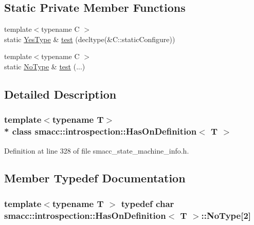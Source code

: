 \subsection*{Static Private Member Functions}
\begin{DoxyCompactItemize}
\item 
{\footnotesize template$<$typename C $>$ }\\static \hyperlink{classsmacc_1_1introspection_1_1HasOnDefinition_ad18cda8f47c5a0e9660b7c7ca54d98c7}{Yes\+Type} \& \hyperlink{classsmacc_1_1introspection_1_1HasOnDefinition_a9271922a017eed3dc8d9ef931239ca3d}{test} (decltype(\&C\+::static\+Configure))
\item 
{\footnotesize template$<$typename C $>$ }\\static \hyperlink{classsmacc_1_1introspection_1_1HasOnDefinition_ab6416d52a925d6a0ce9204897191692e}{No\+Type} \& \hyperlink{classsmacc_1_1introspection_1_1HasOnDefinition_a22cbbab4a5ce8f1b85cfd98a374f7f49}{test} (...)
\end{DoxyCompactItemize}


\subsection{Detailed Description}
\subsubsection*{template$<$typename T$>$\\*
class smacc\+::introspection\+::\+Has\+On\+Definition$<$ T $>$}



Definition at line 328 of file smacc\+\_\+state\+\_\+machine\+\_\+info.\+h.



\subsection{Member Typedef Documentation}
\subsubsection[{\texorpdfstring{No\+Type}{NoType}}]{\setlength{\rightskip}{0pt plus 5cm}template$<$typename T $>$ typedef char {\bf smacc\+::introspection\+::\+Has\+On\+Definition}$<$ T $>$\+::No\+Type\mbox{[}2\mbox{]}\hspace{0.3cm}{\ttfamily [private]}}\hypertarget{classsmacc_1_1introspection_1_1HasOnDefinition_ab6416d52a925d6a0ce9204897191692e}{}\label{classsmacc_1_1introspection_1_1HasOnDefinition_ab6416d52a925d6a0ce9204897191692e}


